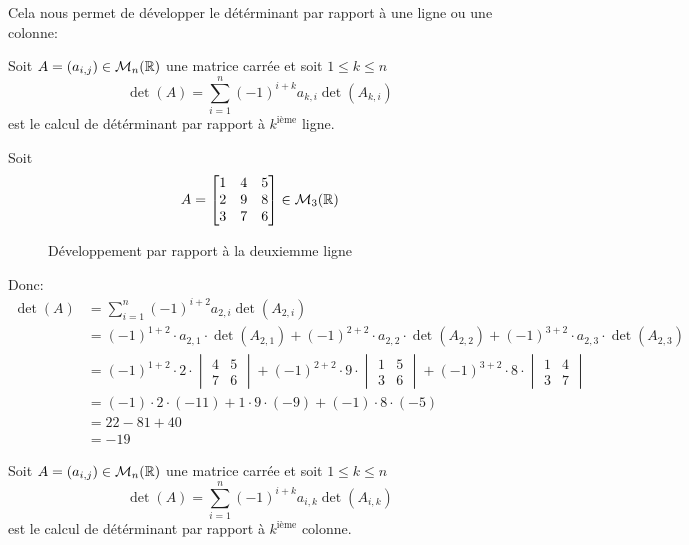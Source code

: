 Cela nous permet de développer le détérminant par rapport à une ligne ou une colonne:
\begin{prop}
    Soit $A = (a_{i, j}) \in \mathcal{M}_n(\mathbb{R})$ une matrice carrée et soit $1 \le k \le n$
    \[
        \displaystyle \det(A) = \sum_{i=1}^{n} (-1)^{i + k} a_{k,i} \det(A_{k, i}) 
    \] 
    est le calcul de détérminant par rapport à $k^{\text{ième}}$ ligne.
\end{prop}
\begin{eg}
   Soit  
   \[
   A = 
   \begin{bmatrix} 
       1 & 4 & 5\\
       2 & 9 & 8\\
       3 & 7 & 6
   \end{bmatrix} \in \mathcal{M}_3(\mathbb{R})
   \] 
\begin{figure}[H]
    \centering
    \caption{Développement par rapport à la deuxiemme ligne}
    \label{fig:mat-ligne-1-colonne-3}
\end{figure}
Donc:
\begin{align*}
    \det(A) &= \sum_{i=1}^{n} (-1)^{i + 2} a_{2, i} \det(A_{2, i}) \\
            &= (-1)^{1 + 2} \cdot a_{2, 1} \cdot \det(A_{2, 1}) + (-1)^{2 + 2} \cdot a_{2, 2} \cdot \det(A_{2,2})  + (-1)^{3 + 2} \cdot a_{2, 3} \cdot \det(A_{2, 3}) \\
            &= (-1)^{1 + 2} \cdot 2 \cdot \begin{vmatrix} 4 & 5 \\ 7 & 6 \end{vmatrix} + (-1)^{2 + 2} \cdot 9 \cdot \begin{vmatrix} 1 & 5 \\ 3 & 6 \end{vmatrix}  + (-1)^{3 + 2} \cdot 8 \cdot \begin{vmatrix} 1 & 4 \\ 3 & 7 \end{vmatrix} \\
            &= (-1) \cdot 2 \cdot (-11) + 1 \cdot 9 \cdot (-9) + (-1) \cdot 8 \cdot (-5)\\
            &= 22 - 81 + 40\\
            &= -19
\end{align*}
\end{eg}

\begin{prop}
    Soit $A = (a_{i, j}) \in \mathcal{M}_n(\mathbb{R})$ une matrice carrée et soit $1 \le k \le n$
    \[
        \displaystyle \det(A) = \sum_{i=1}^{n} (-1)^{i + k} a_{i,k} \det(A_{i,k}) 
    \] 
    est le calcul de détérminant par rapport à $k^{\text{ième}}$ colonne.
\end{prop}

